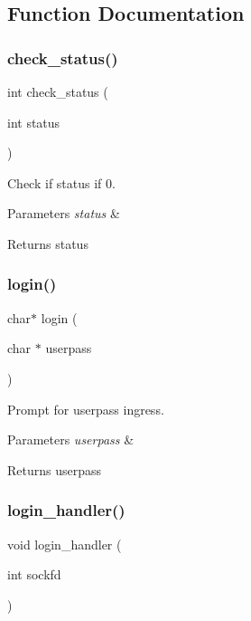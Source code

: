 \subsection{Function Documentation}
\mbox{\label{client_8c_af00002a7d3df82f54b2041a687797915}} 
\subsubsection{check\+\_\+status()}
{\footnotesize\ttfamily int check\+\_\+status (\begin{DoxyParamCaption}\item[{int}]{status }\end{DoxyParamCaption})}



Check if status if 0. 


\begin{DoxyParams}{Parameters}
{\em status} & \\
\hline
\end{DoxyParams}
\begin{DoxyReturn}{Returns}
status 
\end{DoxyReturn}
\mbox{\label{client_8c_a0d2a952bfee88348e1792d66acf01e38}} 
\subsubsection{login()}
{\footnotesize\ttfamily char$\ast$ login (\begin{DoxyParamCaption}\item[{char $\ast$}]{userpass }\end{DoxyParamCaption})}



Prompt for userpass ingress. 


\begin{DoxyParams}{Parameters}
{\em userpass} & \\
\hline
\end{DoxyParams}
\begin{DoxyReturn}{Returns}
userpass 
\end{DoxyReturn}
\mbox{\label{client_8c_a471ae164131962c0fe21a47e23706139}} 
\subsubsection{login\+\_\+handler()}
{\footnotesize\ttfamily void login\+\_\+handler (\begin{DoxyParamCaption}\item[{int}]{sockfd }\end{DoxyParamCaption})}



